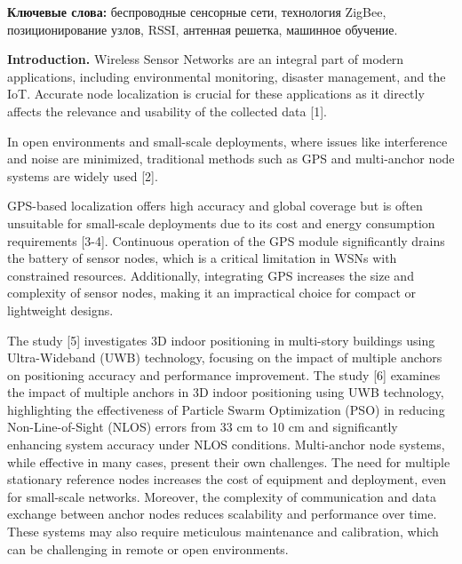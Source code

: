 {\bfseries Ключевые слова:} беспроводные сенсорные сети, технология ZigBee,
позиционирование узлов, RSSI, антенная решетка, машинное обучение.

{\bfseries Introduction.} Wireless Sensor Networks are an integral part of
modern applications, including environmental monitoring, disaster
management, and the IoT. Accurate node localization is crucial for these
applications as it directly affects the relevance and usability of the
collected data {[}1{]}.

In open environments and small-scale deployments, where issues like
interference and noise are minimized, traditional methods such as GPS
and multi-anchor node systems are widely used {[}2{]}.

GPS-based localization offers high accuracy and global coverage but is
often unsuitable for small-scale deployments due to its cost and energy
consumption requirements {[}3-4{]}. Continuous operation of the GPS
module significantly drains the battery of sensor nodes, which is a
critical limitation in WSNs with constrained resources. Additionally,
integrating GPS increases the size and complexity of sensor nodes,
making it an impractical choice for compact or lightweight designs.

The study {[}5{]} investigates 3D indoor positioning in multi-story
buildings using Ultra-Wideband (UWB) technology, focusing on the impact
of multiple anchors on positioning accuracy and performance improvement.
The study {[}6{]} examines the impact of multiple anchors in 3D indoor
positioning using UWB technology, highlighting the effectiveness of
Particle Swarm Optimization (PSO) in reducing Non-Line-of-Sight (NLOS)
errors from 33 cm to 10 cm and significantly enhancing system accuracy
under NLOS conditions. Multi-anchor node systems, while effective in
many cases, present their own challenges. The need for multiple
stationary reference nodes increases the cost of equipment and
deployment, even for small-scale networks. Moreover, the complexity of
communication and data exchange between anchor nodes reduces scalability
and performance over time. These systems may also require meticulous
maintenance and calibration, which can be challenging in remote or open
environments.

